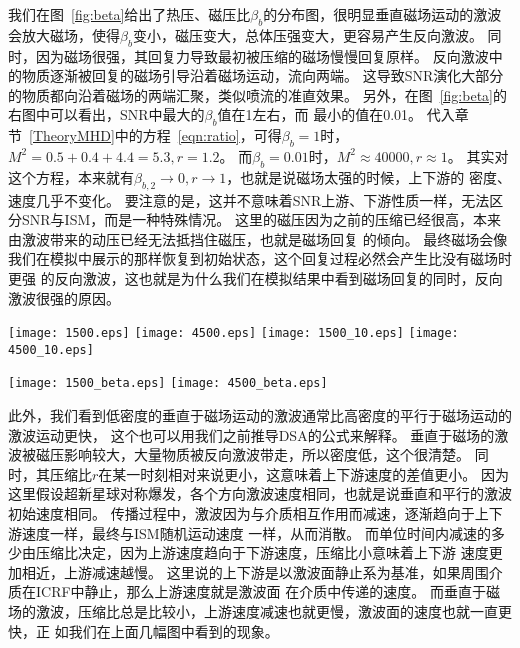 我们在图~\ref{fig:beta}给出了热压、磁压比$\beta_b$的分布图，很明显垂直磁场运动的激波
会放大磁场，使得$\beta_b$变小，磁压变大，总体压强变大，更容易产生反向激波。
同时，因为磁场很强，其回复力导致最初被压缩的磁场慢慢回复原样。
反向激波中的物质逐渐被回复的磁场引导沿着磁场运动，流向两端。
这导致SNR演化大部分的物质都向沿着磁场的两端汇聚，类似喷流的准直效果。
另外，在图~\ref{fig:beta}的右图中可以看出，SNR中最大的$\beta_b$值在1左右，而
最小的值在0.01。
代入章节~\ref{TheoryMHD}中的方程~\ref{eqn:ratio}，可得$\beta_b=1$时，
$M^2=0.5+0.4+4.4=5.3, r=1.2$。
而$\beta_b=0.01$时，$M^2 \approx 40000, r \approx 1$。
其实对这个方程，本来就有$\beta_{b,2}\to 0, r \to 1$，也就是说磁场太强的时候，上下游的
密度、速度几乎不变化。
要注意的是，这并不意味着SNR上游、下游性质一样，无法区分SNR与ISM，而是一种特殊情况。
这里的磁压因为之前的压缩已经很高，本来由激波带来的动压已经无法抵挡住磁压，也就是磁场回复
的倾向。
最终磁场会像我们在模拟中展示的那样恢复到初始状态，这个回复过程必然会产生比没有磁场时更强
的反向激波，这也就是为什么我们在模拟结果中看到磁场回复的同时，反向激波很强的原因。

\begin{figure*}
    \centering
    \texttt{[image: 1500.eps]}
    \texttt{[image: 4500.eps]}\newline
    \texttt{[image: 1500\_10.eps]}
    \texttt{[image: 4500\_10.eps]}
    \caption{强磁场下的高分辨率模拟的密度分布。上面两幅图是介质密度为0.5 cm$^{-3}$时
    1500年和4500年后的模拟结果。
    下面两幅图是介质密度为10 cm$^{-3}$时1500年和4500年后的模拟结果。
    上下图的真实年龄分别要再加上初始的693年和1881年。}
\label{fig:gc}
\end{figure*}

\begin{figure*}
    \centering
    \texttt{[image: 1500\_beta.eps]}
    \texttt{[image: 4500\_beta.eps]}
    \caption{介质密度为0.5 cm$^{-3}$的$\beta_b$分布。
    左图是1500年后的$\beta_b$分布，右图是4500年后的$log(\beta_b)$分布。}
\label{fig:beta}
\end{figure*}

此外，我们看到低密度的垂直于磁场运动的激波通常比高密度的平行于磁场运动的激波运动更快，
这个也可以用我们之前推导DSA的公式来解释。
垂直于磁场的激波被磁压影响较大，大量物质被反向激波带走，所以密度低，这个很清楚。
同时，其压缩比$r$在某一时刻相对来说更小，这意味着上下游速度的差值更小。
因为这里假设超新星球对称爆发，各个方向激波速度相同，也就是说垂直和平行的激波初始速度相同。
传播过程中，激波因为与介质相互作用而减速，逐渐趋向于上下游速度一样，最终与ISM随机运动速度
一样，从而消散。
而单位时间内减速的多少由压缩比决定，因为上游速度趋向于下游速度，压缩比小意味着上下游
速度更加相近，上游减速越慢。
这里说的上下游是以激波面静止系为基准，如果周围介质在ICRF中静止，那么上游速度就是激波面
在介质中传递的速度。
而垂直于磁场的激波，压缩比总是比较小，上游速度减速也就更慢，激波面的速度也就一直更快，正
如我们在上面几幅图中看到的现象。

